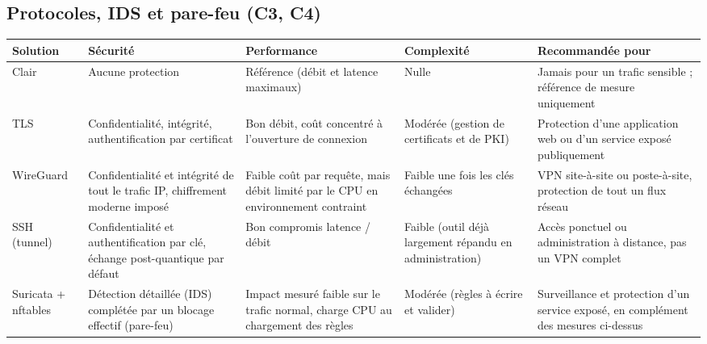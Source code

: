 \documentclass[11pt,a4paper]{article}
\begin{document}
\subsection{Protocoles, IDS et pare-feu (C3, C4)}
\begin{table}[H]
\centering\small
\begin{tabularx}{\textwidth}{l Y Y Y Y}
\toprule
\textbf{Solution} & \textbf{Sécurité} & \textbf{Performance} & \textbf{Complexité} & \textbf{Recommandée pour} \\
\midrule
Clair & Aucune protection & Référence (débit et latence maximaux) & Nulle & Jamais pour un trafic sensible ; référence de mesure uniquement \\
TLS & Confidentialité, intégrité, authentification par certificat & Bon débit, coût concentré à l'ouverture de connexion & Modérée (gestion de certificats et de PKI) & Protection d'une application web ou d'un service exposé publiquement \\
WireGuard & Confidentialité et intégrité de tout le trafic IP, chiffrement moderne imposé & Faible coût par requête, mais débit limité par le CPU en environnement contraint & Faible une fois les clés échangées & VPN site-à-site ou poste-à-site, protection de tout un flux réseau \\
SSH (tunnel) & Confidentialité et authentification par clé, échange post-quantique par défaut & Bon compromis latence / débit & Faible (outil déjà largement répandu en administration) & Accès ponctuel ou administration à distance, pas un VPN complet \\
Suricata + nftables & Détection détaillée (IDS) complétée par un blocage effectif (pare-feu) & Impact mesuré faible sur le trafic normal, charge CPU au chargement des règles & Modérée (règles à écrire et valider) & Surveillance et protection d'un service exposé, en complément des mesures ci-dessus \\
\bottomrule
\end{tabularx}
\end{table}
\end{document}
